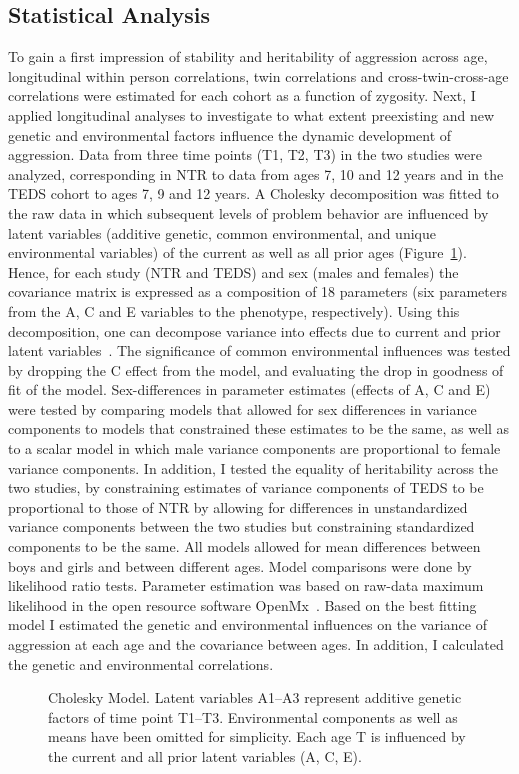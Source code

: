 \subsection{Statistical Analysis}
To gain a first impression of stability and heritability of aggression across age, longitudinal within person correlations, twin correlations and cross-twin-cross-age correlations were estimated for each cohort as a function of zygosity.
Next, I applied longitudinal analyses to investigate to what extent preexisting and new genetic and environmental factors influence the dynamic development of aggression.
Data from three time points (T1, T2, T3) in the two studies were analyzed, corresponding in NTR to data from ages 7, 10 and 12 years and in the TEDS cohort to ages 7, 9 and 12 years.
A Cholesky decomposition was fitted to the raw data in which subsequent levels of problem behavior are influenced by latent variables (additive genetic, common environmental, and unique environmental variables) of the current as well as all prior ages (Figure~\ref{fig:cholesky}).
Hence, for each study (NTR and TEDS) and sex (males and females) the covariance matrix is expressed as a composition of 18 parameters (six parameters from the A, C and E variables to the phenotype, respectively).
Using this decomposition, one can decompose variance into effects due to current and prior latent variables~\cite{Franic2014}.
The significance of common environmental influences was tested by dropping the C effect from the model, and evaluating the drop in goodness of fit of the model.
Sex-differences in parameter estimates (effects of A, C and E) were tested by comparing models that allowed for sex differences in variance components to models that constrained these estimates to be the same, as well as to a scalar model in which male variance components are proportional to female variance components.
In addition, I tested the equality of heritability across the two studies, by constraining estimates of variance components of TEDS to be proportional to those of NTR by allowing for differences in unstandardized variance components between the two studies but constraining standardized components to be the same.
All models allowed for mean differences between boys and girls and between different ages.
Model comparisons were done by likelihood ratio tests.
Parameter estimation was based on raw-data maximum likelihood in the open resource software OpenMx~\cite{Boker2011}.
Based on the best fitting model I estimated the genetic and environmental influences on the variance of aggression at each age and the covariance between ages.
In addition, I calculated the genetic and environmental correlations.

\begin{figure}[htpb]
  \centering
  \scalebox{0.6}{}
  \caption{Cholesky Model. Latent variables A1–A3 represent additive genetic factors of time point T1–T3.
  Environmental components as well as means have been omitted for simplicity.
Each age T is influenced by the current and all prior latent variables (A, C, E).}\label{fig:cholesky}
\end{figure}
